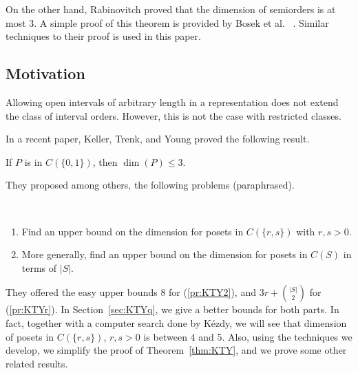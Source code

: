 On the other hand, Rabinovitch \cite{R-78} proved that the dimension of semiorders is at most $3$. A simple proof of this theorem is provided by Bosek et al.~ \cite{BKKM-12}. Similar techniques to their proof is used in this paper.

\subsection{Motivation}
Allowing open intervals of arbitrary length in a representation does not extend the class of interval orders. However, this is not the case with restricted classes.

\begin{comment}
Let $OC(S)$ denote the class of posets that have a representation with every interval length in $S$, but allowing a mixture of open and closed intervals. Extend all the shorthands used with the $C$-notation to be used with the $OC$-notation. As mentioned above, it is easy to see that $C(\mathbb{R}^+)=OC(\mathbb{R}^+)$. On the other hand, $\tpo$ is in $OC(1)$ but not in $C(1)$.
\end{comment}

In a recent paper, Keller, Trenk, and Young \cite{KTY-22} proved the following result.
\begin{theorem}\label{thm:KTY}
If $P$ is in $C(\{0,1\})$, then $\dim(P)\leq 3$.
\end{theorem}

They proposed among others, the following problems (paraphrased).
\begin{problem}\ \label{pr:KTY}
\begin{enumerate}
\item \label{pr:KTY2} Find an upper bound on the dimension for posets in $C(\{r,s\})$ with $r,s>0$.
\item \label{pr:KTYr} More generally, find an upper bound on the dimension for posets in $C(S)$ in terms of $|S|$.
\end{enumerate}
\end{problem}

They offered the easy upper bounds $8$ for (\ref{pr:KTY2}), and $3r+\binom{|S|}{2}$ for (\ref{pr:KTYr}). In Section~\ref{sec:KTYq}, we give a better bounds for both parts. In fact, together with a computer search done by K\'ezdy, we will see that dimension of posets in $C(\{r,s\})$, $r,s>0$ is between $4$ and $5$. Also, using the techniques we develop, we simplify the proof of Theorem~\ref{thm:KTY}, and we prove some other related results.

